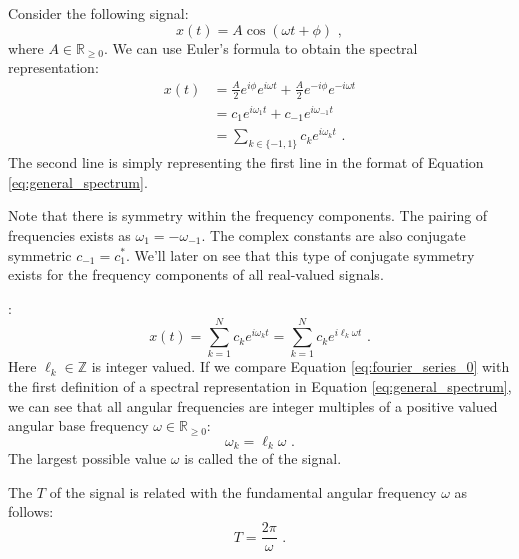 Consider the following signal:
\begin{equation}
  x(t)=A\cos(\omega t+\phi) \,\,,
\end{equation}
where $A\in \mathbb{R}_{\ge 0}$. We can use Euler's formula to obtain the spectral representation:
\begin{align}
  x(t) & = \frac{A}{2}e^{i\phi}e^{i\omega t} + \frac{A}{2}e^{-i\phi}e^{-i\omega t} \\
       & = c_1 e^{i\omega_1 t} + c_{-1} e^{i\omega_{-1} t}                         \\
       & = \sum_{k\in\{-1,1\}} c_k e^{i\omega_k t} \,\,.
\end{align}
The second line is simply representing the first line in the format of Equation \ref{eq:general_spectrum}.

Note that there is symmetry within the frequency components. The pairing of frequencies exists as $\omega_{1}=-\omega_{-1}$.
The complex constants are also conjugate symmetric $c_{-1} = c_{1}^*$. We'll later on see
that this type of conjugate symmetry exists for the frequency components of all real-valued signals.

:
\begin{equation}
  x(t) = \sum_{k=1}^N c_k e^{i \omega_k t} = \sum_{k=1}^N c_k e^{i \ell_k \omega t} \,\,.
  \label{eq:fourier_series_0}
\end{equation}
Here $\ell_k \in \mathbb{Z}$ is integer valued. If we compare Equation \ref{eq:fourier_series_0} with
the first definition of a spectral representation in Equation \ref{eq:general_spectrum}, we can see
that all angular frequencies are integer multiples of a positive valued angular
base frequency $\omega \in \mathbb{R}_{\ge 0}$:
\begin{equation}
  \omega_k = \ell_k\omega \,\,.
  \label{eq:integer_multiple}
\end{equation}
The largest possible value $\omega$ is called
the \emph{} of the signal. 

The \emph{} $T$ of the
signal is related with the fundamental angular frequency $\omega$ as
follows:
\begin{equation}
  \boxed{
    T = \frac{2\pi}{\omega}
  } \,\,.
  \label{eq:fundamental_period}
\end{equation}

